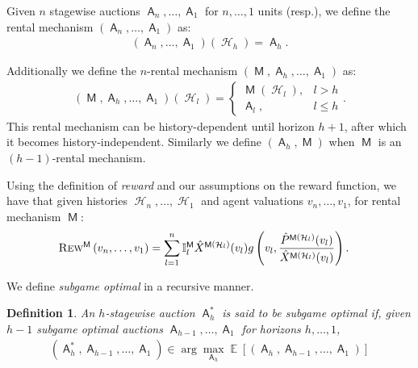 \documentclass[11pt,letterpaper]{article}
\newcommand{\sqbr}[1]{\left[ #1 \right]}
\newcommand{\brackets}[1]{\left( #1 \right)}
\DeclareMathOperator*{\E}{\bb{E}}
\DeclareMathOperator{\history}{\mathcal{H}}
\newcommand{\bb}[1]{\mathbb{#1}}
\DeclareMathOperator{\A}{\auc{A}}
\DeclareMathOperator{\D}{\mathcal{D}}
\DeclareMathOperator{\M}{\mech{M}}
\newcommand{\g}{g}
\newcommand{\sumof}[3]{\sum_{{#1}={#2}}^{#3}\limits}
\theoremstyle{plain}
\newtheorem{definition}{Definition}
\newcommand{\auc}[1]{\mathsf{#1}}
\newcommand{\mech}[1]{\mathsf{#1}}
\begin{document}
Given $n$ stagewise auctions $\A_n,\dots, \A_1$ for $n,\dots,1$ units (resp.), we define the rental mechanism $ \brackets{\A_n,\dots,\A_1}$ as:
\begin{align*}
    \brackets{\A_n,\dots,\A_1}(\history_h)=\A_h.
\end{align*}

Additionally we  define the $n$-rental mechanism $\brackets{\M,\A_h,\dots,\A_1}$ as:
\begin{align}
    \brackets{\M,\A_h,\dots,\A_1}(\history_l)=\begin{cases}
        \M(\history_l),& l>h\\
        \A_l,& l\leq h
    \end{cases}.
\end{align}
This rental mechanism can be history-dependent until horizon $h+1$, after which it becomes history-independent. Similarly we define $\brackets{\A_h,\M}$ when $\M$ is an $(h-1)$-rental mechanism.


Using the definition of \emph{reward} and our assumptions on the reward function, we have that given histories $\history_n,\dots,\history_1$ and agent valuations $v_n,\dots,v_1$,  for rental mechanism $\M$:
\begin{align*}
    \trew[\M]{v_n,\dots,v_1}&=\sumof{l}{1}{n}\ind[\M]{l}\xhat[\M(\history_l)]{v_l}\g\brackets{v_l,\frac{\phat[\M(\history_l)]{v_l}}{\xhat[\M(\history_l)]{v_l}}}.
\end{align*}

We define \emph{subgame optimal} in a recursive manner. 
\begin{definition}
    An $h$-stagewise auction $\A_h^*$ is said to be \textnormal{subgame optimal} if, given $h-1$ subgame optimal auctions $\A_{h-1},\dots,\A_1$ for horizons $h,\dots,1$,
    \begin{align*}
    \brackets{\A_h^*,\A_{h-1},\dots,\A_1}\in\arg\max_{\A_h}\E\sqbr{\brackets{\A_h,\A_{h-1},\dots,\A_1}}
    \end{align*}
\end{definition}
\end{document}
